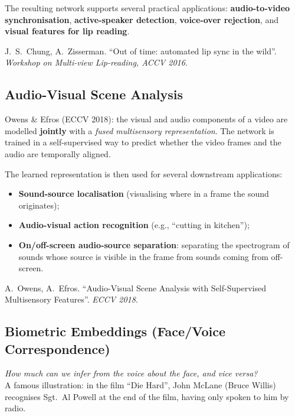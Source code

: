 \documentclass[11pt,a4paper]{article}
\theoremstyle{definition}
\theoremstyle{plain}
\theoremstyle{remark}
\begin{document}
The resulting network supports several practical applications: \textbf{audio-to-video synchronisation}, \textbf{active-speaker detection}, \textbf{voice-over rejection}, and \textbf{visual features for lip reading}.

\begin{tcolorbox}[colback=blue!5!white,colframe=blue!60!black,title={Reference}]
J.\ S.\ Chung, A.\ Zisserman. ``Out of time: automated lip sync in the wild''. \textit{Workshop on Multi-view Lip-reading, ACCV 2016}.
\end{tcolorbox}

\subsection{Audio-Visual Scene Analysis}

Owens \& Efros (ECCV 2018): the visual and audio components of a video are modelled \textbf{jointly} with a \emph{fused multisensory representation}. The network is trained in a self-supervised way to predict whether the video frames and the audio are temporally aligned.

The learned representation is then used for several downstream applications:
\begin{itemize}
    \item[(a)] \textbf{Sound-source localisation} (visualising where in a frame the sound originates);
    \item[(b)] \textbf{Audio-visual action recognition} (e.g., ``cutting in kitchen'');
    \item[(c)] \textbf{On/off-screen audio-source separation}: separating the spectrogram of sounds whose source is visible in the frame from sounds coming from off-screen.
\end{itemize}

\begin{tcolorbox}[colback=blue!5!white,colframe=blue!60!black,title={Reference}]
A.\ Owens, A.\ Efros. ``Audio-Visual Scene Analysis with Self-Supervised Multisensory Features''. \textit{ECCV 2018}.
\end{tcolorbox}

\subsection{Biometric Embeddings (Face/Voice Correspondence)}

\begin{tcolorbox}[colback=green!5!white,colframe=green!60!black,title=\textbf{The Question}]
\emph{How much can we infer from the voice about the face, and vice versa?}\\
A famous illustration: in the film ``Die Hard'', John McLane (Bruce Willis) recognises Sgt.\ Al Powell at the end of the film, having only spoken to him by radio.
\end{tcolorbox}
\end{document}
